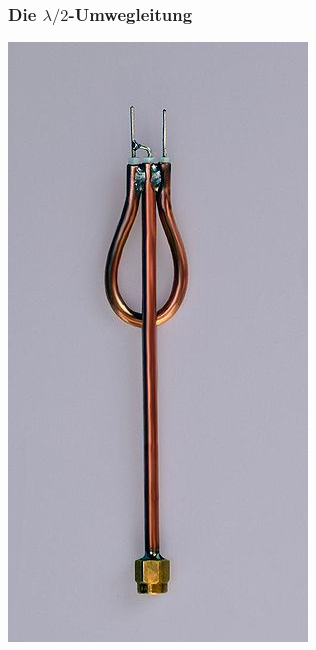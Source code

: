 \begin{frame}
  \frametitle{Die $\lambda /2$-Umwegleitung}
  \begin{minipage}{0.3\textwidth}
    \includegraphics[height=.8\textheight,width=\textwidth,keepaspectratio]{a10/Umwegleitung.jpg}\\

\end{minipage}
\end{frame}
